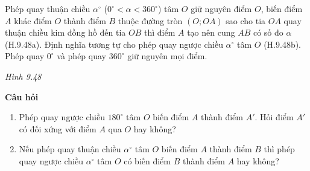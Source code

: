 \begin{lesson}
    \begin{keyconcept}
        Phép quay thuận chiều $\alpha^\circ$ ($0^\circ<\alpha<360^\circ$) tâm $O$ giữ nguyên điểm $O$, biến điểm $A$ khác điểm $O$ thành điểm $B$ thuộc đường tròn $(O;OA)$ sao cho tia $OA$ quay thuận chiều kim đồng hồ đến tia $OB$ thì điểm $A$ tạo nên cung $AB$ có số đo $\alpha$ (H.9.48a). Định nghĩa tương tự cho phép quay ngược chiều $\alpha^\circ$ tâm $O$ (H.9.48b). Phép quay $0^\circ$ và phép quay $360^\circ$ giữ nguyên mọi điểm.
    \end{keyconcept}

    \begin{center}

        \textit{Hình 9.48}
    \end{center}

    \textbf{Câu hỏi}
    \begin{enumerate}[label=\alph*)]
        \item Phép quay ngược chiều $180^\circ$ tâm $O$ biến điểm $A$ thành điểm $A'$. Hỏi điểm $A'$ có đối xứng với điểm $A$ qua $O$ hay không?
        \item Nếu phép quay thuận chiều $\alpha^\circ$ tâm $O$ biến điểm $A$ thành điểm $B$ thì phép quay ngược chiều $\alpha^\circ$ tâm $O$ có biến điểm $B$ thành điểm $A$ hay không?
    \end{enumerate}


\end{lesson}
